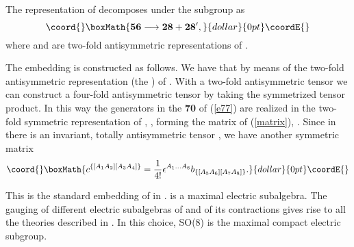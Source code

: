 \documentclass[a4paper,12pt]{article}
\begin{document}
The representation \coordHE{} of \coordHE{} decomposes under the
subgroup \coordHE{} as $$\coord{}\boxMath{\mathbf{56}\longrightarrow
\mathbf{28}+\mathbf{28'},}{dollar}{0pt}\coordE{}$$ where \coordHE{} and \coordHE{}
are two-fold antisymmetric representations of \coordHE{}.

The embedding \coordHE{} is constructed as
follows. We have that \coordHE{} by means of
the two-fold antisymmetric representation (the \coordHE{}) of
\coordHE{}.
 With
a  two-fold antisymmetric tensor we can construct a four-fold
antisymmetric tensor by taking the symmetrized tensor product. In
this way the generators in the
 {\bf 70} of (\ref{e77}) are realized in the two-fold symmetric
 representation of \coordHE{}, \coordHE{},
 forming the \coordHE{} matrix of (\ref{matrix}),
 \coordHE{}. Since in \coordHE{} there is
 an invariant, totally antisymmetric tensor \coordHE{}, we have another symmetric matrix
 $$\coord{}\boxMath{c^{\{[A_1A_2][A_3
 A_4]\}}=\frac 1{4!}\epsilon^{A_1\dots
 A_8}b_{\{[A_5A_6][A_7
 A_8]\}}.}{dollar}{0pt}\coordE{}$$






 This is the standard
embedding of \coordHE{} in \coordHE{}.  \coordHE{} is a
maximal electric subalgebra. The gauging of different electric
subalgebras of \coordHE{} and of its contractions gives rise to
all the theories described in \cite{hw,cfgtt}. In this choice,
SO(8) is the maximal compact electric subgroup.

\bigskip
\end{document}
